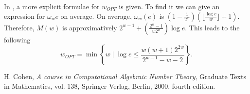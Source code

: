 \documentclass[12pt,a4paper]{article}
\begin{document}
    In \cite[p.~10-11]{cohen}, a more explicit formulae for $w_{OPT}$ is given. To find it we can give an expression for $\omega_w{e}$ on average.
    On average, $\omega_w(e)$ is $(1 - \frac 1 {2^w})(\lfloor \frac{\log e}{w}\rfloor + 1)$.
    Therefore, $M(w)$ is approximatively $2^{w-1} + (\frac{2^w - 1}{w2^w})\log e$. This leads to the following
    \[
        w_{OPT} = \min\left\{w \mid \log e \leq \frac{w(w+1)2^{2w}}{2^{w+1} -w -2}\right\}.
    \]

    \begin{thebibliography}{9}
        H. Cohen,
        \emph{ A course in Computational Algebraic Number Theory},
        Graduate Texts in Mathematics, vol. 138, Springer-Verlag, Berlin, 2000, fourth edition.
    \end{thebibliography}
\end{document}
